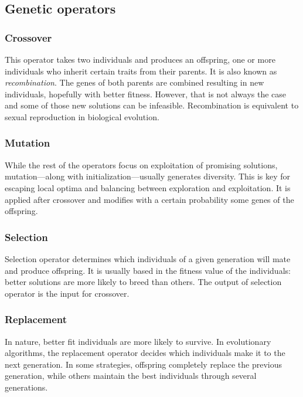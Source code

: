 \subsection{Genetic operators}
	\subsubsection{Crossover}
		This operator takes two individuals and produces an offspring, one or more individuals who inherit certain traits from their parents. It is also known as \textit{recombination}. The genes of both parents are combined resulting in new individuals, hopefully with better fitness. However, that is not always the case and some of those new solutions can be infeasible. Recombination is equivalent to sexual reproduction in biological evolution.  
	\subsubsection{Mutation}
		While the rest of the operators focus on exploitation of promising solutions, mutation---along with initialization---usually generates diversity. This is key for escaping local optima and balancing between exploration and exploitation. It is applied after crossover and modifies with a certain probability some genes of the offspring.
	\subsubsection{Selection}
		Selection operator determines which individuals of a given generation will mate and produce offspring. It is usually based in the fitness value of the individuals: better solutions are more likely to breed than others. The output of selection operator is the input for crossover.
	\subsubsection{Replacement}
		In nature, better fit individuals are more likely to survive. In evolutionary algorithms, the replacement operator decides which individuals make it to the next generation. In some strategies, offspring completely replace the previous generation, while others maintain the best individuals through several generations. 
